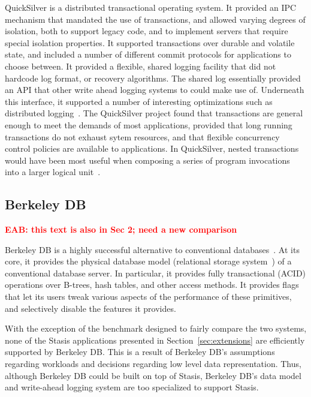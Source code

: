 \documentclass[letterpaper,twocolumn,10pt]{article}
\newcommand{\yad}{Stasis\xspace}
\newcommand{\eab}[1]{\textcolor{red}{\bf EAB: #1}}
\begin{document}
QuickSilver is a distributed transactional operating system.  It
provided an IPC mechanism that mandated the use of transactions, and
allowed varying degrees of isolation, both to support legacy code, and
to implement servers that require special isolation properties.  It
supported transactions over durable and volatile state, and included a
number of different commit protocols for applications to choose
between.  It provided a flexible, shared logging facility that did not
hardcode log format, or recovery algorithms.  The shared log
essentially provided an API that other write ahead logging systems to
could make use of.  Underneath this interface, it supported a number
of interesting optimizations such as distributed
logging~\cite{recoveryInQuickSilver}.  The QuickSilver project found
that transactions are general enough to meet the demands of most
applications, provided that long running transactions do not exhaust
sytem resources, and that flexible concurrency control policies are
available to applications.  In QuickSilver, nested transactions would
have been most useful when composing a series of program invocations
into a larger logical unit~\cite{experienceWithQuickSilver}.

\subsection{Berkeley DB}

\eab{this text is also in Sec 2; need a new comparison}

Berkeley DB is a highly successful alternative to conventional
databases~\cite{libtp}.  At its core, it provides the physical database model
(relational storage system~\cite{systemR}) of a conventional database server.
In particular, 
it provides fully transactional (ACID) operations over B-trees, 
hash tables, and other access methods.  It provides flags that 
let its users tweak various aspects of the performance of these
primitives, and selectively disable the features it provides.

With the
exception of the benchmark designed to fairly compare the two systems, none of the \yad 
applications presented in Section~\ref{sec:extensions} are efficiently
supported by Berkeley DB.   This is a result of Berkeley DB's  
assumptions regarding workloads and decisions regarding low level data
representation.  Thus, although Berkeley DB could be built on top of \yad,
Berkeley DB's data model and write-ahead logging system are too specialized to support \yad.
\end{document}
